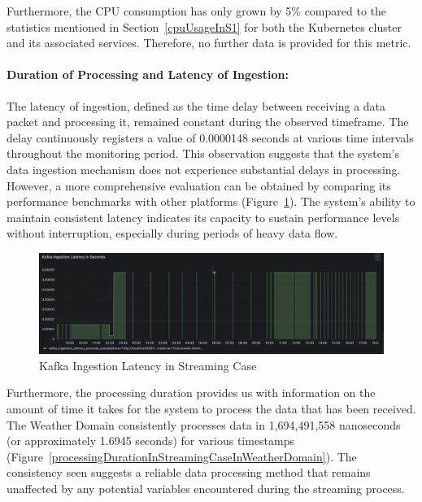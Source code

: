 \documentclass[preprint,12pt]{elsarticle}
\begin{document}
Furthermore, the CPU consumption has only grown by 5\% compared to the statistics mentioned in Section~\ref{cpuUsageInS1} for both the Kubernetes cluster and its associated services. Therefore, no further data is provided for this metric.

\paragraph{Duration of Processing and Latency of Ingestion:} The latency of ingestion, defined as the time delay between receiving a data packet and processing it, remained constant during the observed timeframe. The delay continuously registers a value of 0.0000148 seconds at various time intervals throughout the monitoring period. This observation suggests that the system's data ingestion mechanism does not experience substantial delays in processing. However, a more comprehensive evaluation can be obtained by comparing its performance benchmarks with other platforms (Figure~\ref{kafkaIngestionLatencyInStreamingCase}). The system's ability to maintain consistent latency indicates its capacity to sustain performance levels without interruption, especially during periods of heavy data flow.

\begin{figure}[h]
  \centering
  \includegraphics[width=\textwidth]{images/kafka-ingestion-latency-sum-streaming-case.png}
  \caption{Kafka Ingestion Latency in Streaming Case}
  \label{kafkaIngestionLatencyInStreamingCase}
\end{figure}

Furthermore, the processing duration provides us with information on the amount of time it takes for the system to process the data that has been received. The Weather Domain consistently processes data in 1,694,491,558 nanoseconds (or approximately 1.6945 seconds) for various timestamps (Figure~\ref{processingDurationInStreamingCaseInWeatherDomain}). The consistency seen suggests a reliable data processing method that remains unaffected by any potential variables encountered during the streaming process.
\end{document}
